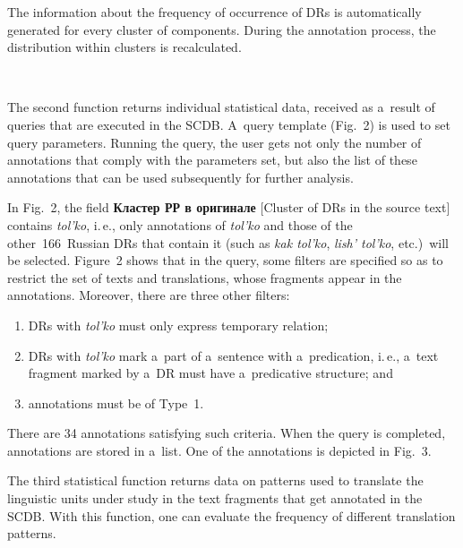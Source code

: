 \begin{multicols}{2}
  
  
  The information about the frequency of occurrence of DRs is automatically 
generated for every cluster of components. During the annotation process, the 
distribution within clusters is recalculated.

\begin{figure*} %
 \vspace*{1pt}
\begin{center}
\mbox{%
\epsfxsize=138.435mm
}
\end{center}
\end{figure*}
  
  The second function returns individual statistical data, received as a~result of queries 
that are executed in the SCDB. A~query template (Fig.~2) is used to set query 
parameters. Running the query, the user gets not only the number of annotations 
that comply with the parameters set, but also the list of these annotations that can 
be used subsequently for further analysis.
  
  In Fig.~2, the field \textbf{Кластер РР в оригинале} [Cluster of DRs in the 
source text] contains \textit{tol'ko}, i.\,e., only annotations of \textit{tol'ko} and 
those of the other~166~Russian DRs that contain it (such as \textit{kak tol'ko}, 
\textit{lish' tol'ko}, etc.)\ will be selected. Figure~2 shows that in the query, some 
filters are specified so as to restrict the set of texts and translations, whose 
fragments appear in the annotations. Moreover, there are three other filters:
  \begin{enumerate}[(1)]
\item DRs with \textit{tol'ko} must only express temporary relation;
\item DRs with \textit{tol'ko} mark a~part of a~sentence with a~predication, 
i.\,e., a~text fragment marked by a~DR must have a~predicative structure; and
\item annotations must be of Type~1.
\end{enumerate}

  There are 34 annotations satisfying such criteria. When the query is completed, 
annotations are stored in a~list. One of the annotations is depicted in Fig.~3.


  The third statistical function returns data on patterns used to translate the linguistic 
units under study in the text fragments that get annotated in the SCDB. With this 
function, one can evaluate the frequency of different translation patterns.



\end{multicols}
